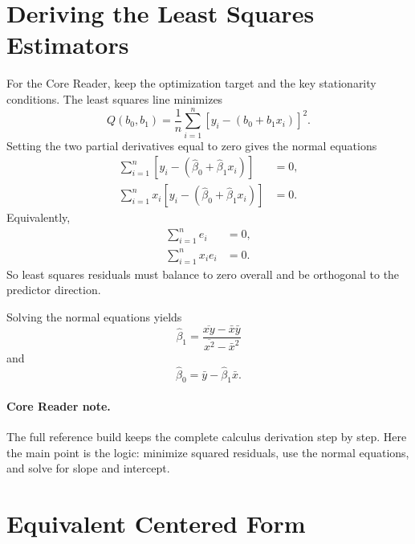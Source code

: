 {\section{Deriving the Least Squares Estimators}

For the Core Reader, keep the optimization target and the key stationarity conditions.  The least squares line minimizes
\begin{equation}
  Q(b_0,b_1)=\frac{1}{n}\sum_{i=1}^n\left[y_i-(b_0+b_1x_i)\right]^2.
  \label{eq:ch5-objective-q}
\end{equation}
Setting the two partial derivatives equal to zero gives the normal equations
\begin{align}
  \sum_{i=1}^n\left[y_i-(\widehat{\beta}_0+\widehat{\beta}_1x_i)\right] &= 0,
  \label{eq:ch5-normal-equation-one} \\
  \sum_{i=1}^n x_i\left[y_i-(\widehat{\beta}_0+\widehat{\beta}_1x_i)\right] &= 0.
  \label{eq:ch5-normal-equation-two}
\end{align}
Equivalently,
\begin{align}
  \sum_{i=1}^n e_i &= 0, \\
  \sum_{i=1}^n x_i e_i &= 0.
\end{align}
So least squares residuals must balance to zero overall and be orthogonal to the predictor direction.

Solving the normal equations yields
\begin{equation}
  \boxed{\widehat{\beta}_1=\frac{\overline{xy}-\bar{x}\bar{y}}{\overline{x^2}-\bar{x}^2}}
  \label{eq:ch5-beta1-raw-moment-form}
\end{equation}
and
\begin{equation}
  \boxed{\widehat{\beta}_0=\bar{y}-\widehat{\beta}_1\bar{x}.}
  \label{eq:ch5-beta0-formula}
\end{equation}

\paragraph{Core Reader note.}
The full reference build keeps the complete calculus derivation step by step.  Here the main point is the logic: minimize squared residuals, use the normal equations, and solve for slope and intercept.
}

\section{Equivalent Centered Form}

